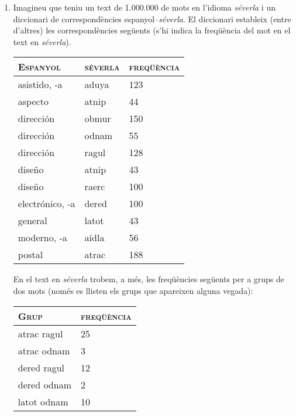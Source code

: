 \begin{enumerate}
    \item Imagineu que teniu un text de 1.000.000 de mots en l'idioma
      \emph{séverla} i un diccionari de correspondències
      espanyol--\emph{séverla}. El diccionari estableix (entre
      d'altres) les correspondències següents (s'hi indica la
      freqüència del mot en el text en \emph{séverla}).
      \begin{center}
      \begin{tabular}{l|l|l}
      \hline\hline
      \textsc{Espanyol} & \textsc{séverla} & \textsc{freqüència} \\
      \hline
      \textsf{asistido, -a} & \textsf{aduya} & 123 \\
      \textsf{aspecto} & \textsf{atnip} & 44 \\ 
      \textsf{dirección} & \textsf{obmur} & 150  \\
      \textsf{dirección} & \textsf{odnam} & 55 \\
      \textsf{dirección} & \textsf{ragul} & 128 \\
      \textsf{diseño} & \textsf{atnip} & 43 \\
      \textsf{diseño} & \textsf{raerc} & 100 \\
      \textsf{electrónico, -a} & \textsf{dered} & 100 \\
      \textsf{general} & \textsf{latot}  & 43 \\
      \textsf{moderno, -a} & \textsf{aídla} & 56 \\
      \textsf{postal} & \textsf{atrac} & 188 \\
      \hline
      \end{tabular}
    \end{center}
    En el text en \emph{séverla} trobem, a més, les freqüències
    següents per a grups de dos mots (només es llisten els grups que
    apareixen alguna vegada):
      \begin{center}
        \begin{tabular}{l|l}  
        \hline\hline 
        \textsc{Grup} & \textsc{freqüència} \\\hline
        \textsf{atrac ragul} & 25 \\
        \textsf{atrac odnam} & 3 \\
        \textsf{dered ragul} & 12 \\
        \textsf{dered odnam} & 2 \\
        \textsf{latot odnam} & 10 \\

\end{tabular}
\end{center}
\end{enumerate}
